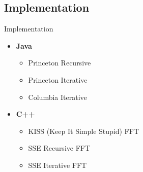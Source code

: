 \documentclass[xcolor={table}]{beamer}
\begin{document}

\subsection{Implementation}

\begin{frame}{Implementation}
    \begin{itemize}[<+->]
        \item \textbf{Java}
            \begin{itemize}[<.->]
                \item Princeton Recursive
                \item Princeton Iterative
                \item Columbia Iterative
            \end{itemize}
        \item \textbf{C++}
            \begin{itemize}[<.->]
                \item KISS (Keep It Simple Stupid) FFT
                \item SSE Recursive FFT
                \item SSE Iterative FFT
            \end{itemize}
    \end{itemize}
\end{frame}
\end{document}
